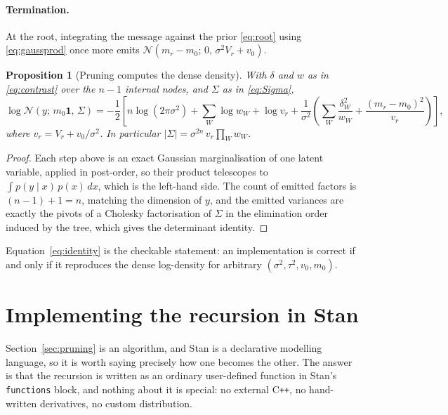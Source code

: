 \documentclass[11pt]{article}
\newtheorem{proposition}{Proposition}
\theoremstyle{remark}
\newcommand{\Norm}{\mathcal{N}}
\newcommand{\one}{\mathbf{1}}
\begin{document}
\paragraph{Termination.} At the root, integrating the message against the prior \eqref{eq:root}
using \eqref{eq:gaussprod} once more emits
$\Norm\!\left(m_r - m_0;\, 0,\, \sigma^2 V_r + v_0\right)$.

\begin{proposition}[Pruning computes the dense density]
\label{prop:identity}
With $\delta$ and $w$ as in \eqref{eq:contrast} over the $n-1$ internal nodes, and $\Sigma$ as in
\eqref{eq:Sigma},
\begin{equation}
  \log \Norm\!\left(y;\, m_0\one,\, \Sigma\right)
  =
  -\frac{1}{2}\left[
    n \log(2\pi\sigma^2)
    + \sum_{W} \log w_{\!\scriptscriptstyle W} + \log v_r
    + \frac{1}{\sigma^2}\left(\sum_{W} \frac{\delta_{\!\scriptscriptstyle W}^2}{w_{\!\scriptscriptstyle W}}
      + \frac{(m_r-m_0)^2}{v_r}\right)
  \right],
  \label{eq:identity}
\end{equation}
where $v_r = V_r + v_0/\sigma^2$. In particular
$\lvert\Sigma\rvert = \sigma^{2n}\, v_r \prod_{W} w_{\!\scriptscriptstyle W}$.
\end{proposition}

\begin{proof}
Each step above is an exact Gaussian marginalisation of one latent variable, applied in post-order,
so their product telescopes to $\int p(y \mid x)\,p(x)\,dx$, which is the left-hand side. The count
of emitted factors is $(n-1) + 1 = n$, matching the dimension of $y$, and the emitted variances are
exactly the pivots of a Cholesky factorisation of $\Sigma$ in the elimination order induced by the
tree, which gives the determinant identity.
\end{proof}

Equation~\eqref{eq:identity} is the checkable statement: an implementation is correct if and only if
it reproduces the dense log-density for arbitrary $(\sigma^2, \tau^2, v_0, m_0)$.

\section{Implementing the recursion in Stan}
\label{sec:stan}

Section~\ref{sec:pruning} is an algorithm, and Stan is a declarative modelling language, so
it is worth saying precisely how one becomes the other. The answer is that the recursion is
written as an ordinary user-defined function in Stan's \texttt{functions} block, and nothing
about it is special: no external C\texttt{++}, no hand-written derivatives, no custom
distribution.
\end{document}
